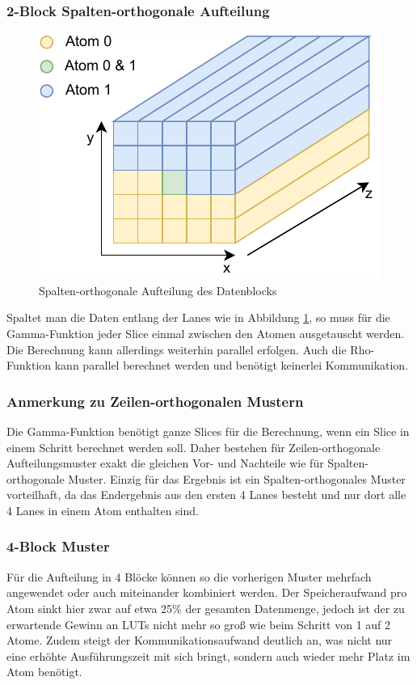 \subsubsection{2-Block Spalten-orthogonale Aufteilung}
\label{cha:iteration_1_optimierungen_spaltenorthogonal}
\begin{figure}
    \center
    \includegraphics{images/Spaltenorthogonal.pdf}
    \caption{Spalten-orthogonale Aufteilung des Datenblocks}
    \label{fig:2_block_spaltenorthogonal}
\end{figure}
Spaltet man die Daten entlang der Lanes wie in Abbildung \ref{fig:2_block_spaltenorthogonal}, so muss für die Gamma-Funktion jeder Slice
einmal zwischen den Atomen ausgetauscht werden. Die Berechnung kann allerdings weiterhin parallel erfolgen. Auch die Rho-Funktion kann
parallel berechnet werden und benötigt keinerlei Kommunikation.

\subsubsection{Anmerkung zu Zeilen-orthogonalen Mustern}
Die Gamma-Funktion benötigt ganze Slices für die Berechnung, wenn ein Slice in einem Schritt berechnet werden soll.
Daher bestehen für Zeilen-orthogonale Aufteilungsmuster exakt die gleichen Vor- und Nachteile wie für Spalten-orthogonale Muster.
Einzig für das Ergebnis ist ein Spalten-orthogonales Muster vorteilhaft, da das Endergebnis aus den ersten 4 Lanes besteht und nur dort alle 4 Lanes in einem Atom enthalten sind.

\subsubsection{4-Block Muster}
Für die Aufteilung in 4 Blöcke können so die vorherigen Muster mehrfach angewendet oder auch miteinander kombiniert werden.
Der Speicheraufwand pro Atom sinkt hier zwar auf etwa 25\% der gesamten Datenmenge, jedoch ist der zu erwartende Gewinn an LUTs nicht mehr so groß wie beim Schritt von 1 auf 2 Atome.
Zudem steigt der Kommunikationsaufwand deutlich an, was nicht nur eine erhöhte Ausführungszeit mit sich bringt, sondern auch wieder mehr Platz im Atom benötigt.